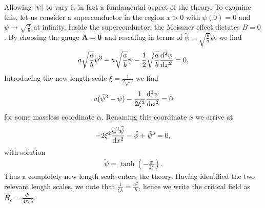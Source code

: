 Allowing $\abs{\psi}$ to vary is in fact a fundamental aspect of the theory. To examine this, let us consider a superconductor in the region $x > 0$ with $\psi(0) = 0$ and $\psi\to\sqrt{\frac{a}{b}}$ at infinity. Inside the superconductor, the Meissner effect dictates $B = 0$. By choosing the gauge $\vb{A} = \vb{0}$ and rescaling in terms of $\tilde{\psi} = \sqrt{\frac{b}{a}}\psi$, we find
\begin{align*}
	a\sqrt{\frac{a}{b}}\tilde{\psi}^{3} - a\sqrt{\frac{a}{b}}\psi - \frac{1}{2}\sqrt{\frac{a}{b}}\dv[2]{\psi}{x} = 0.
\end{align*}
Introducing the new length scale $\xi = \frac{1}{2\sqrt{a}}$ we find
\begin{align*}
	a(\tilde{\psi}^{3} - \psi) - \frac{1}{2\xi^{2}}\dv[2]{\psi}{\alpha} = 0
\end{align*}
for some massless coordinate $\alpha$. Renaming this coordinate $x$ we arrive at
\begin{align*}
	-2\xi^{2}\dv[2]{\tilde{\psi}}{x} - \tilde{\psi} + \tilde{\psi}^{3} = 0,
\end{align*}
with solution
\begin{align*}
	\tilde{\psi} = \tanh(-\frac{x}{2\xi}).
\end{align*}
Thus a completely new length scale enters the theory. Having identified the two relevant length scales, we note that $\frac{1}{\xi\lambda} = \frac{a^{2}}{b}$, hence we write the critical field as $H_{\text{c}} = \frac{\Phi_{0}}{4\pi\xi\lambda}$.

